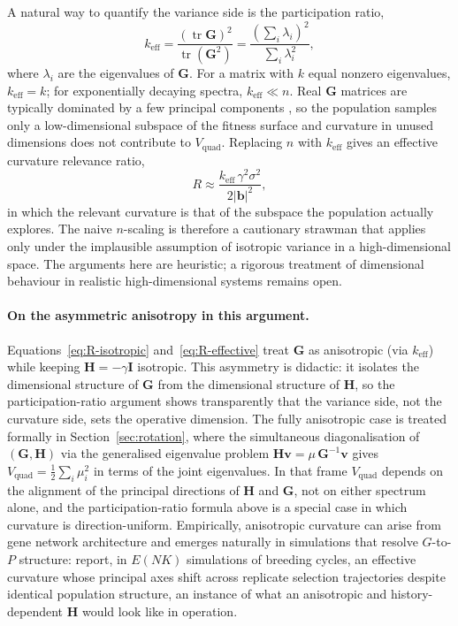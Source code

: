 \documentclass[9pt,twocolumn,twoside,lineno]{gsajnl}
\newcommand{\vect}[1]{\boldsymbol{#1}}
\newcommand{\mat}[1]{\mathbf{#1}}
\newcommand{\tr}{\ensuremath{\operatorname{tr}}\xspace}
\newcommand{\Vquad}{\ensuremath{V_{\text{quad}}}\xspace}
\newcommand{\keff}{\ensuremath{k_{\mathrm{eff}}}\xspace}
\begin{document}
A natural way to quantify the variance side is the participation ratio,
\begin{equation}
\keff = \frac{(\tr \mat{G})^2}{\tr(\mat{G}^2)} = \frac{\left(\sum_i \lambda_i\right)^2}{\sum_i \lambda_i^2},
\label{eq:keff}
\end{equation}
where $\lambda_i$ are the eigenvalues of $\mat{G}$. For a matrix with $k$ equal nonzero eigenvalues, $\keff = k$; for exponentially decaying spectra, $\keff \ll n$. Real $\mat{G}$ matrices are typically dominated by a few principal components \citep{Blows2007, Kirkpatrick2009, Walsh2009}, so the population samples only a low-dimensional subspace of the fitness surface and curvature in unused dimensions does not contribute to $\Vquad$. Replacing $n$ with $\keff$ gives an effective curvature relevance ratio,
\begin{equation}
R \approx \frac{\keff\, \gamma^2 \sigma^2}{2 |\vect{b}|^2},
\label{eq:R-effective}
\end{equation}
in which the relevant curvature is that of the subspace the population actually explores. The naive $n$-scaling is therefore a cautionary strawman that applies only under the implausible assumption of isotropic variance in a high-dimensional space. The arguments here are heuristic; a rigorous treatment of dimensional behaviour in realistic high-dimensional systems remains open.

\paragraph{On the asymmetric anisotropy in this argument.}
Equations~\eqref{eq:R-isotropic} and~\eqref{eq:R-effective} treat $\mat{G}$ as anisotropic (via $\keff$) while keeping $\mat{H}=-\gamma\mat{I}$ isotropic. This asymmetry is didactic: it isolates the dimensional structure of $\mat{G}$ from the dimensional structure of $\mat{H}$, so the participation-ratio argument shows transparently that the variance side, not the curvature side, sets the operative dimension. The fully anisotropic case is treated formally in Section~\ref{sec:rotation}, where the simultaneous diagonalisation of $(\mat{G},\mat{H})$ via the generalised eigenvalue problem $\mat{H}\vect{v}=\mu\,\mat{G}^{-1}\vect{v}$ gives $\Vquad = \tfrac{1}{2}\sum_i \mu_i^2$ in terms of the joint eigenvalues. In that frame $\Vquad$ depends on the alignment of the principal directions of $\mat{H}$ and $\mat{G}$, not on either spectrum alone, and the participation-ratio formula above is a special case in which curvature is direction-uniform. Empirically, anisotropic curvature can arise from gene network architecture and emerges naturally in simulations that resolve $G$-to-$P$ structure: \citet{Technow2026} report, in $E(NK)$ simulations of breeding cycles, an effective curvature whose principal axes shift across replicate selection trajectories despite identical population structure, an instance of what an anisotropic and history-dependent $\mat{H}$ would look like in operation.
\end{document}
